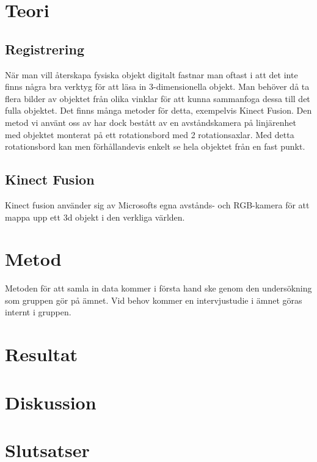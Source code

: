 \section{Teori}
\label{sec:theory-karlsson}



\subsection{Registrering}

När man vill återskapa fysiska objekt digitalt fastnar man oftast i att det inte finns några bra verktyg för att läsa in 3-dimensionella objekt. Man behöver då ta flera bilder av objektet från olika vinklar för att kunna sammanfoga dessa till det fulla objektet. Det finns många metoder för detta, exempelvis Kinect Fusion. Den metod vi använt oss av har dock bestått av en avståndskamera på linjärenhet med objektet monterat på ett rotationsbord med 2 rotationsaxlar. Med detta rotationsbord kan men förhållandevis enkelt se hela objektet från en fast punkt.


\subsection{Kinect Fusion}

Kinect fusion använder sig av Microsofts egna avstånds- och RGB-kamera för att mappa upp ett 3d objekt i den verkliga världen. 

\section{Metod}
\label{sec:method-karlsson}


Metoden för att samla in data kommer i första hand ske genom den undersökning som gruppen gör på ämnet. Vid behov kommer en intervjustudie i ämnet göras internt i gruppen. 


\section{Resultat}
\label{sec:results-karlsson}


\section{Diskussion}
\label{sec:discussion-karlsson}


\section{Slutsatser}
\label{sec:conclusions-karlsson}


